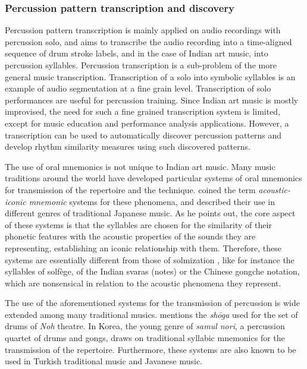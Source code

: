 \subsubsection{Percussion pattern transcription and discovery}
Percussion pattern transcription is mainly applied on audio recordings with percussion solo, and aims to transcribe the audio recording into a time-aligned sequence of drum stroke labels, and in the case of Indian art music, into percussion syllables. Percussion transcription is a sub-problem of the more general music transcription. Transcription of a solo into symbolic syllables is an example of audio segmentation at a fine grain level. Transcription of solo performances are useful for percussion training. Since Indian art music is mostly improvised, the need for such a fine grained transcription system is limited, except for music education and performance analysis applications. However, a transcription can be used to automatically discover percussion patterns and develop rhythm similarity measures using such discovered patterns. 

The use of oral mnemonics is not unique to Indian art music. Many music traditions around the world have developed particular systems of oral mnemonics for transmission of the repertoire and the technique.  coined the term \textit{acoustic-iconic mnemonic} systems for these phenomena, and described their use in different genres of traditional Japanese music. As he points out, the core aspect of these systems is that the syllables are chosen for the similarity of their phonetic features with the acoustic properties of the sounds they are representing, establishing an iconic relationship with them. Therefore, these systems are essentially different from those of solmization \cite[accessed June 2016]{hughes:14:grovesolmization}, like for instance the syllables of solfège, of the Indian svaras (notes) or the Chinese gongche notation, which are nonsensical in relation to the acoustic phenomena they represent. 

The use of the aforementioned systems for the transmission of percussion is wide extended among many traditional musics.  mentions the \textit{shōga} used for the set of drums of \textit{Noh} theatre. In Korea, the young genre of \textit{samul nori}, a percussion quartet of drums and gongs, draws on traditional syllabic mnemonics for the transmission of the repertoire. Furthermore, these systems are also known to be used in Turkish traditional music and Javanese music. 

